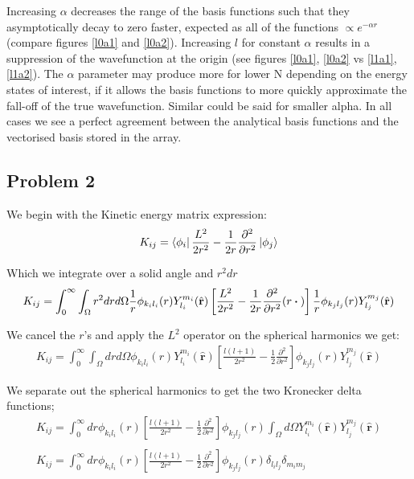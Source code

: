 \documentclass{article}
\renewcommand{\vec}[1]{\mathbf{#1}}
\let\oldhat\hat
\renewcommand{\hat}[1]{\oldhat{\mathbf{#1}}}
\begin{document}
    Increasing $\alpha$ decreases the range of the basis functions such that they asymptotically decay to zero faster, expected as all of the functions $\propto e^{-\alpha r}$ (compare figures \ref{l0a1} and \ref{l0a2}). Increasing $l$ for constant $\alpha$ results in a suppression of the wavefunction at the origin (see figures \ref{l0a1}, \ref{l0a2} vs \ref{l1a1}, \ref{l1a2}). The $\alpha$ parameter may produce more for lower N depending on the energy states of interest, if it allows the basis functions to more quickly approximate the fall-off of the true wavefunction. Similar could be said for smaller alpha. In all cases we see a perfect agreement  between the analytical basis functions and the vectorised basis stored in the array.
    
    
    \subsection{Problem 2}
    
    We begin with the Kinetic energy matrix expression:
    \large
    \begin{gather}
    	K_{ij} = \bra{\phi_i} \frac{L^2}{2r^2} -\frac{1}{2r}\frac{\partial^2}{\partial r^2} \ket{\phi_j}
    \end{gather}
    \normalsize
    
    Which we integrate over a solid angle and $r^2dr$
    \large
    \begin{gather}
    	K_{ij} = \int_{0}^{\infty}\int_{\Omega} r^2drd\Omega \frac{1}{r}\phi_{k_il_i}(r)Y^{m_i}_{l_i} (\hat{\vec{r}}) \left[ \frac{L^2}{2r^2} -\frac{1}{2r}\frac{\partial^2}{\partial r^2}(r\dotproduct{}) \right] \frac{1}{r}\phi_{k_jl_j}(r)Y^{m_j}_{l_j}(\hat{\vec{r}})
    \end{gather}
    \normalsize
    
    We cancel the $r$'s and apply the $L^2$ operator on the spherical harmonics we get:
    \large
    \begin{gather}
    	K_{ij} = \int_{0}^{\infty}\int_{\Omega} drd\Omega \phi_{k_il_i}(r)Y^{m_i}_{l_i} (\hat{\vec{r}}) \left[ \frac{l(l+1)}{2r^2} -\frac{1}{2}\frac{\partial^2}{\partial r^2} \right] \phi_{k_jl_j}(r)Y^{m_j}_{l_j}(\hat{\vec{r}})
    \end{gather}
    \normalsize
    
    We separate out the spherical harmonics to get the two Kronecker delta functions;
    \large
    \begin{gather}
    	K_{ij} = \int_{0}^{\infty} dr \phi_{k_il_i}(r) \left[ \frac{l(l+1)}{2r^2} -\frac{1}{2}\frac{\partial^2}{\partial r^2} \right] \phi_{k_jl_j}(r) \int_{\Omega}d\Omega Y^{m_i}_{l_i}(\hat{\vec{r}})Y^{m_j}_{l_j}(\hat{\vec{r}})\\
    	\\
    	K_{ij} = \int_{0}^{\infty} dr \phi_{k_il_i}(r) \left[ \frac{l(l+1)}{2r^2} -\frac{1}{2}\frac{\partial^2}{\partial r^2} \right] \phi_{k_jl_j}(r) \delta_{l_il_j} \delta_{m_im_j}
    \end{gather}
    \normalsize
    
\end{document}
